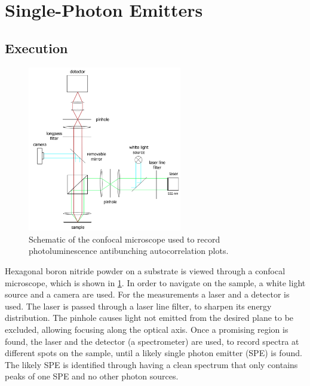 \section{Single-Photon Emitters}
\label{sec:SPE}

\subsection{Execution}

\begin{figure}[H]
    \centering
    \includegraphics[width=0.6\textwidth]{img/setup2.png}
    \caption{Schematic of the confocal microscope used to record photoluminescence antibunching autocorrelation plots.}
    \label{fig_confocal}
\end{figure}

Hexagonal boron nitride powder on a substrate is viewed through a confocal microscope, which is shown in \cref{fig_confocal}.
In order to navigate on the sample, a white light source and a camera are used.
For the measurements a laser and a detector is used.
The laser is passed through a laser line filter, to sharpen its energy distribution.
The pinhole causes light not emitted from the desired plane to be excluded, allowing focusing along the optical axis.
Once a promising region is found, the laser and the detector (a spectrometer) are used, to record spectra at different spots on the sample, until a likely single photon emitter (SPE) is found.
The likely SPE is identified through having a clean spectrum that only contains peaks of one SPE and no other photon sources.

